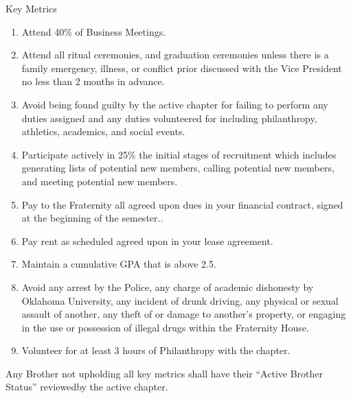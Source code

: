 \documentclass{article}
\begin{document}
Key Metrics

\begin{enumerate}
    \item Attend 40\% of Business Meetings.
    \item Attend all ritual ceremonies, and graduation ceremonies unless there is a family emergency, illness, or conflict prior discussed with the Vice President no less than 2 months in advance.
    \item Avoid being found guilty by the active chapter for failing to perform any duties assigned and any duties volunteered for including philanthropy, athletics, academics, and social events.
    \item Participate actively in 25\% the initial stages of recruitment which includes generating lists of potential new members, calling potential new members, and meeting potential new members.
    \item Pay to the Fraternity all agreed upon dues in your financial contract, signed at the beginning of the semester..
    \item Pay rent as scheduled agreed upon in your lease agreement.
    \item Maintain a cumulative GPA that is above 2.5.
    \item Avoid any arrest by the Police, any charge of academic dishonesty by Oklahoma University, any incident of drunk driving, any physical or sexual assault of another, any theft of or damage to another’s property, or engaging in the use or possession of illegal drugs within the Fraternity House.
    \item Volunteer for at least 3 hours of Philanthropy with the chapter.
\end{enumerate}

Any Brother not upholding all key metrics shall have their “Active Brother Status” reviewed\footnotemark by the active chapter.

\end{document}
